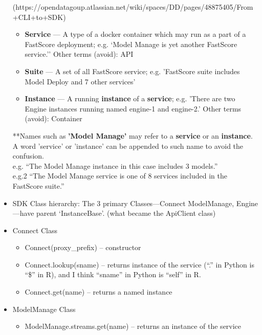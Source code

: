 \documentclass{article}
\begin{document}
\begin{itemize}
(https://opendatagoup.atlassian.net/wiki/spaces/DD/pages/48875405/From+CLI+to+SDK)
        \begin{itemize}
        \item {\bf Service} --- A type of a docker container which may run as a part of a FastScore deployment; e.g. `Model Manage is yet another FastScore service.'' Other terms (avoid): API
        \item {\bf Suite} --- A set of all FastScore service; e.g. 'FastScore suite includes Model Deploy and 7 other services'
        \item {\bf  Instance} --- A running {\bf instance} of a {\bf service}; e.g. 'There are two Engine instances running named engine-1 and engine-2.' Other terms (avoid): Container
        \end{itemize}
**Names such as {\bf 'Model Manage'} may refer to a {\bf service} or an {\bf instance}. A word 'service' or 'instance' can be appended to such name to avoid the confusion. \\ e.g. ``The Model Manage instance in this case includes 3 models.'' \\ e.g.2 ``The Model Manage service is one of 8 services included in the FastScore suite.''

\item SDK Class hierarchy: The 3 primary Classes---Connect ModelManage, Engine---have parent `InstanceBase'. (what became the ApiClient class)
\item Connect Class
        \begin{itemize}
        \item Connect(proxy\_prefix) -- constructor
        \item Connect.lookup(sname) -- returns instance of the service (``.'' in Python is ``\$'' in R), and I think ``sname'' in Python is ``self'' in R.
        \item Connect.get(name) -- returns a named instance
        \end{itemize}
\item ModelManage Class
        \begin{itemize}
        \item ModelManage.streams.get(name) -- returns an instance of the service
        \end{itemize}

\end{itemize}
\end{document}
